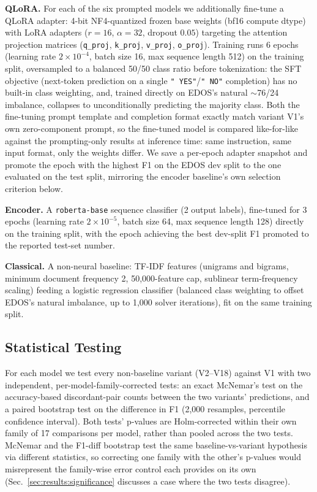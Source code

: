 \textbf{QLoRA.} For each of the six prompted models we additionally
fine-tune a QLoRA adapter: 4-bit NF4-quantized frozen base weights (bf16
compute dtype) with LoRA adapters ($r{=}16$, $\alpha{=}32$, dropout
$0.05$) targeting the attention projection matrices
(\texttt{q\_proj}, \texttt{k\_proj}, \texttt{v\_proj}, \texttt{o\_proj}).
Training runs 6 epochs (learning rate $2{\times}10^{-4}$, batch size 16,
max sequence length 512) on the training split, oversampled to a balanced
50/50 class ratio before tokenization: the SFT objective (next-token
prediction on a single \texttt{" YES"}/\texttt{" NO"} completion) has no
built-in class weighting, and, trained directly on EDOS's natural
$\sim$76/24 imbalance, collapses to unconditionally predicting the
majority class. Both the fine-tuning prompt template and completion format
exactly match variant V1's own zero-component prompt, so the fine-tuned
model is compared like-for-like against the prompting-only results at
inference time: same instruction, same input format, only the weights
differ. We save a per-epoch adapter snapshot and promote the epoch with
the highest F1 on the EDOS dev split to the one evaluated on the test
split, mirroring the encoder baseline's own selection criterion below.

\textbf{Encoder.} A \texttt{roberta-base} sequence classifier
(2 output labels), fine-tuned for 3 epochs (learning rate
$2{\times}10^{-5}$, batch size 64, max sequence length 128) directly on
the training split, with the epoch achieving the best dev-split F1
promoted to the reported test-set number.

\textbf{Classical.} A non-neural baseline: TF-IDF features
(unigrams and bigrams, minimum document frequency 2, 50,000-feature cap,
sublinear term-frequency scaling) feeding a logistic regression classifier
(balanced class weighting to offset EDOS's natural imbalance, up to 1,000
solver iterations), fit on the same training split.

\subsection{Statistical Testing}
\label{sec:methodology:stats}

For each model we test every non-baseline variant (V2--V18) against V1
with two independent, per-model-family-corrected tests: an exact
McNemar's test on the accuracy-based discordant-pair counts between the
two variants' predictions, and a paired bootstrap test on the difference
in F1 (2,000 resamples, percentile confidence interval). Both tests'
p-values are Holm-corrected within their own family of 17 comparisons per
model, rather than pooled across the two tests. McNemar and the F1-diff
bootstrap test the same baseline-vs-variant hypothesis via different
statistics, so correcting one family with the other's p-values would
misrepresent the family-wise error control each provides on its own
(Sec.~\ref{sec:results:significance} discusses a case where the two tests
disagree).

